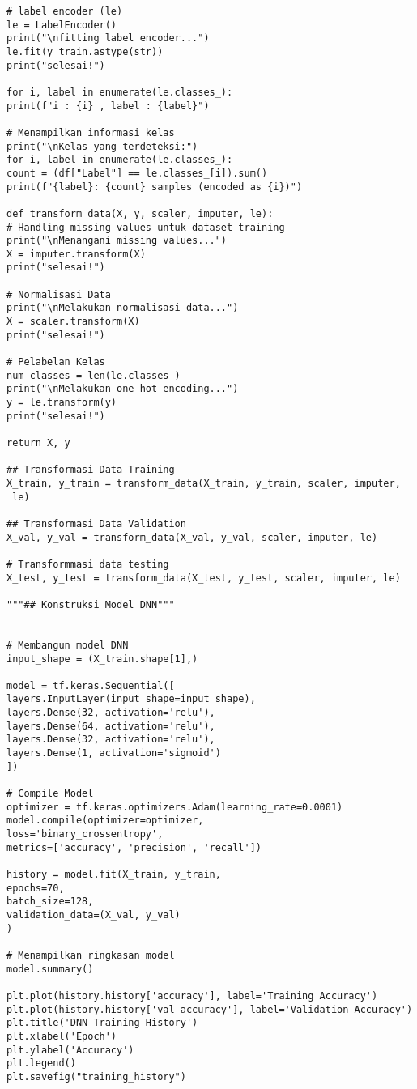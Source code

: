 \documentclass[a4paper,12pt]{report}
\begin{document}
\begin{lstlisting}
# label encoder (le)
le = LabelEncoder()
print("\nfitting label encoder...")
le.fit(y_train.astype(str))
print("selesai!")

for i, label in enumerate(le.classes_):
print(f"i : {i} , label : {label}")

# Menampilkan informasi kelas
print("\nKelas yang terdeteksi:")
for i, label in enumerate(le.classes_):
count = (df["Label"] == le.classes_[i]).sum()
print(f"{label}: {count} samples (encoded as {i})")

def transform_data(X, y, scaler, imputer, le):
# Handling missing values untuk dataset training
print("\nMenangani missing values...")
X = imputer.transform(X)
print("selesai!")

# Normalisasi Data
print("\nMelakukan normalisasi data...")
X = scaler.transform(X)
print("selesai!")

# Pelabelan Kelas
num_classes = len(le.classes_)
print("\nMelakukan one-hot encoding...")
y = le.transform(y)
print("selesai!")

return X, y

## Transformasi Data Training
X_train, y_train = transform_data(X_train, y_train, scaler, imputer,
 le)

## Transformasi Data Validation
X_val, y_val = transform_data(X_val, y_val, scaler, imputer, le)

# Transformmasi data testing
X_test, y_test = transform_data(X_test, y_test, scaler, imputer, le)

"""## Konstruksi Model DNN"""


# Membangun model DNN
input_shape = (X_train.shape[1],)

model = tf.keras.Sequential([
layers.InputLayer(input_shape=input_shape),
layers.Dense(32, activation='relu'),
layers.Dense(64, activation='relu'), 
layers.Dense(32, activation='relu'), 
layers.Dense(1, activation='sigmoid') 
])

# Compile Model
optimizer = tf.keras.optimizers.Adam(learning_rate=0.0001)
model.compile(optimizer=optimizer,
loss='binary_crossentropy',
metrics=['accuracy', 'precision', 'recall'])

history = model.fit(X_train, y_train,
epochs=70,
batch_size=128,
validation_data=(X_val, y_val)
)

# Menampilkan ringkasan model
model.summary()

plt.plot(history.history['accuracy'], label='Training Accuracy')
plt.plot(history.history['val_accuracy'], label='Validation Accuracy')
plt.title('DNN Training History')
plt.xlabel('Epoch')
plt.ylabel('Accuracy')
plt.legend()
plt.savefig("training_history")


\end{lstlisting}
\end{document}

